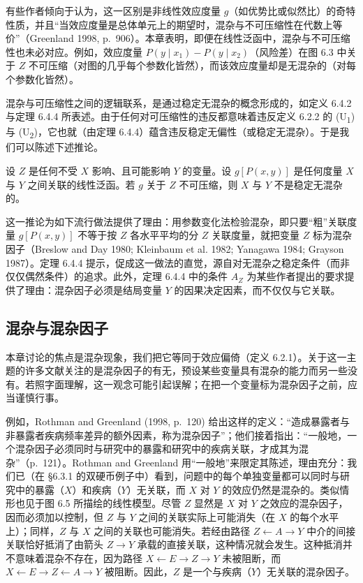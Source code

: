 有些作者倾向于认为，这一区别是非线性效应度量 $g$（如优势比或似然比）的奇特性质，并且“当效应度量是总体单元上的期望时，混杂与不可压缩性在代数上等价”（Greenland 1998, p.~906）。本章表明，即便在线性泛函中，混杂与不可压缩性也未必对应。例如，效应度量 $P(y\mid x_1)-P(y\mid x_2)$（风险差）在图 6.3 中关于 $Z$ 不可压缩（对图的几乎每个参数化皆然），而该效应度量却是无混杂的（对每个参数化皆然）。

混杂与可压缩性之间的逻辑联系，是通过稳定无混杂的概念形成的，如定义 6.4.2 与定理 6.4.4 所表述。由于任何对可压缩性的违反都意味着违反定义 6.2.2 的 (U\textsubscript{1}) 与 (U\textsubscript{2})，它也就（由定理 6.4.4）蕴含违反稳定无偏性（或稳定无混杂）。于是我们可以陈述下述推论。

\begin{corollary}[稳定无混杂蕴含可压缩性]
设 $Z$ 是任何不受 $X$ 影响、且可能影响 $Y$ 的变量。设 $g[P(x,y)]$ 是任何度量 $X$ 与 $Y$ 之间关联的线性泛函。若 $g$ 关于 $Z$ 不可压缩，则 $X$ 与 $Y$ 不是稳定无混杂的。
\end{corollary}

这一推论为如下流行做法提供了理由：用参数变化法检验混杂，即只要“粗”关联度量 $g[P(x,y)]$ 不等于按 $Z$ 各水平平均的分 $Z$ 关联度量，就把变量 $Z$ 标为混杂因子（Breslow and Day 1980; Kleinbaum et al. 1982; Yanagawa 1984; Grayson 1987）。定理 6.4.4 提示，促成这一做法的直觉，源自对无混杂之稳定条件（而非仅仅偶然条件）的追求。此外，定理 6.4.4 中的条件 $A_Z$ 为某些作者提出的要求提供了理由：混杂因子必须是结局变量 $Y$ 的因果决定因素，而不仅仅与它关联。

\subsection{混杂与混杂因子}

本章讨论的焦点是混杂现象，我们把它等同于效应偏倚（定义 6.2.1）。关于这一主题的许多文献关注的是混杂因子的有无，预设某些变量具有混杂的能力而另一些没有。若照字面理解，这一观念可能引起误解；在把一个变量标为混杂因子之前，应当谨慎行事。

例如，Rothman and Greenland (1998, p.~120) 给出这样的定义：“造成暴露者与非暴露者疾病频率差异的额外因素，称为混杂因子”；他们接着指出：“一般地，一个混杂因子必须同时与研究中的暴露和研究中的疾病关联，才成其为混杂”（p.~121）。Rothman and Greenland 用“一般地”来限定其陈述，理由充分：我们已（在 \S 6.3.1 的双硬币例子中）看到，问题中的每个单独变量都可以同时与研究中的暴露（$X$）和疾病（$Y$）无关联，而 $X$ 对 $Y$ 的效应仍然是混杂的。类似情形也见于图 6.5 所描绘的线性模型。尽管 $Z$ 显然是 $X$ 对 $Y$ 之效应的混杂因子，因而必须加以控制，但 $Z$ 与 $Y$ 之间的关联实际上可能消失（在 $X$ 的每个水平上）；同样，$Z$ 与 $X$ 之间的关联也可能消失。若经由路径 $Z\leftarrow A\to Y$ 中介的间接关联恰好抵消了由箭头 $Z\to Y$ 承载的直接关联，这种情况就会发生。这种抵消并不意味着混杂不存在，因为路径 $X\leftarrow E\to Z\to Y$ 未被阻断，而 $X\leftarrow E\to Z\leftarrow A\to Y$ 被阻断。因此，$Z$ 是一个与疾病（$Y$）无关联的混杂因子。

